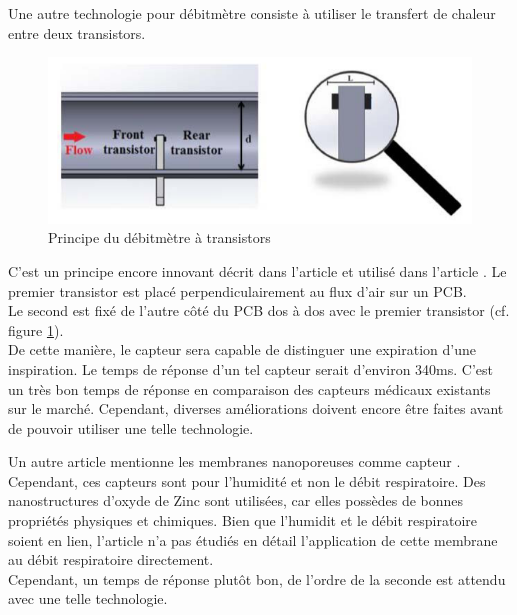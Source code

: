 Une autre technologie pour débitmètre consiste à utiliser le transfert de chaleur entre deux transistors. 
\begin{figure}[H]
    \centering
    \includegraphics[scale = 0.5]{images/Debitmetre_transistors.png}
    \caption{Principe du débitmètre à transistors}
    \label{fig:transistors}
\end{figure}
C'est un principe encore innovant décrit dans l'article \cite{giorgino_design_2014} et utilisé dans l'article \cite{rosi_device_2016}. 
Le premier transistor est placé perpendiculairement au flux d'air sur un PCB. \\
Le second est fixé de l'autre côté du PCB dos à dos avec le premier transistor (cf. figure \ref{fig:transistors}). \\
De cette manière, le capteur sera capable de distinguer une expiration d'une inspiration. Le temps de réponse d'un tel capteur serait 
d'environ 340ms. C'est un très bon temps de réponse en comparaison des capteurs médicaux existants sur le marché. Cependant, diverses améliorations 
doivent encore être faites avant de pouvoir utiliser une telle technologie. \\

Un autre article mentionne les membranes nanoporeuses comme capteur \cite{moharamzadeh_fabrication_2018}. Cependant, ces capteurs sont pour l'humidité et non le débit 
respiratoire. Des nanostructures d'oxyde de Zinc sont utilisées, car elles possèdes de bonnes propriétés physiques et chimiques. Bien que l'humidit 
et le débit respiratoire soient en lien, l'article n'a pas étudiés en détail l'application de cette membrane au débit respiratoire directement. \\
Cependant, un temps de réponse plutôt bon, de l'ordre de la seconde est attendu avec une telle technologie. \\

